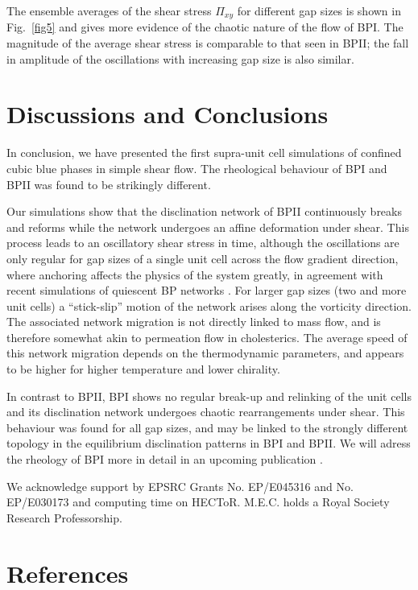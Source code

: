 \documentclass[12pt,twoside]{iopart}
\begin{document}
The ensemble averages of the shear stress $\Pi_{xy}$ for different gap sizes
is shown in Fig.~\ref{fig5} and gives more evidence of the chaotic nature of
the flow of BPI. The magnitude of the average shear stress is comparable to
that seen in BPII; the fall in amplitude of the oscillations with increasing
gap size is also similar.

\section{Discussions and Conclusions}

In conclusion, we have presented the first supra-unit cell simulations of
confined cubic blue phases in simple shear flow.
The rheological behaviour of BPI and BPII was found to be strikingly different.

Our simulations show that the disclination network of BPII continuously breaks and reforms while the network undergoes an affine deformation under shear. This process leads to an oscillatory shear stress in time, although the oscillations are only regular for gap sizes of a single unit cell across the flow gradient direction, where anchoring affects the physics of the system greatly, in agreement with recent simulations of quiescent BP networks \cite{Fukuda:2010a, Fukuda:2010b, Ravnik:2011b}.
For larger gap sizes (two and more unit cells) a ``stick-slip'' motion of
the network arises along the vorticity direction. The associated network
migration is not directly linked to mass flow, and is therefore somewhat
akin to permeation flow in cholesterics. The average speed of this network
migration depends on the thermodynamic parameters, and appears to be higher
for higher temperature and lower chirality. 

In contrast to BPII, BPI shows no regular break-up and relinking of the unit cells and its disclination network undergoes chaotic rearrangements under shear.
This behaviour was found for all gap sizes, and may be linked to the
strongly different topology in the equilibrium disclination patterns in
BPI and BPII. We will adress the rheology of BPI more in detail in an
upcoming publication \cite{Henrich:2012}.  

\ack
We acknowledge support by EPSRC Grants No. EP/E045316 and No. EP/E030173 and computing time on HECToR.
M.E.C. holds a Royal Society Research Professorship.


\section*{References}



\end{document}
